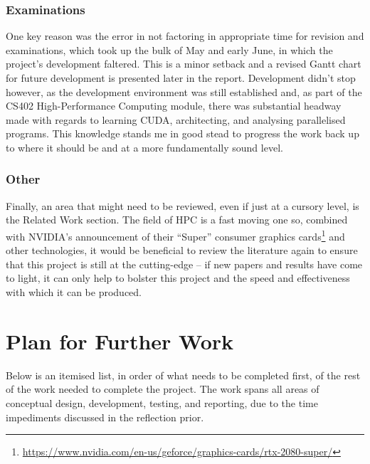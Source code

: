 \documentclass[conference]{IEEEtran}
\begin{document}
\subsubsection{Examinations}

One key reason was the error in not factoring in appropriate time for revision and examinations, which took up the bulk of May and early June, in which the project’s development faltered. This is a minor setback and a revised Gantt chart for future development is presented later in the report.
Development didn’t stop however, as the development environment was still established and, as part of the CS402 High-Performance Computing module, there was substantial headway made with regards to learning CUDA, architecting, and analysing parallelised programs. This knowledge stands me in good stead to progress the work back up to where it should be and at a more fundamentally sound level.


\subsubsection{Other}

Finally, an area that might need to be reviewed, even if just at a cursory level, is the Related Work section. The field of HPC is a fast moving one so, combined with NVIDIA’s announcement of their ``Super” consumer graphics cards\footnote{\url{https://www.nvidia.com/en-us/geforce/graphics-cards/rtx-2080-super/}} and other technologies, it would be beneficial to review the literature again to ensure that this project is still at the cutting-edge – if new papers and results have come to light, it can only help to bolster this project and the speed and effectiveness with which it can be produced.



\section{Plan for Further Work}

Below is an itemised list, in order of what needs to be completed first, of the rest of the work needed to complete the project. The work spans all areas of conceptual design, development, testing, and reporting, due to the time impediments discussed in the reflection prior.
\end{document}
